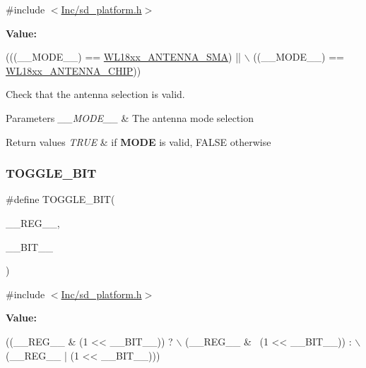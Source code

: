 {\ttfamily \#include $<$\mbox{\hyperlink{sd__platform_8h}{Inc/sd\+\_\+platform.\+h}}$>$}

{\bfseries Value\+:}
\begin{DoxyCode}
(((\_\_MODE\_\_) == \mbox{\hyperlink{group___s_d___antenna___select_gad34710c5325cf565b89f2ce2f6fde3ae}{WL18xx\_ANTENNA\_SMA}}) || \(\backslash\)
                       ((\_\_MODE\_\_) == \mbox{\hyperlink{group___s_d___antenna___select_ga1de725e07aecec98314b752abb71e644}{WL18xx\_ANTENNA\_CHIP}}))
\end{DoxyCode}


Check that the antenna selection is valid. 


\begin{DoxyParams}{Parameters}
{\em \+\_\+\+\_\+\+M\+O\+D\+E\+\_\+\+\_\+} & The antenna mode selection \\
\hline
\end{DoxyParams}

\begin{DoxyRetVals}{Return values}
{\em T\+R\+UE} & if {\bfseries M\+O\+DE} is valid, F\+A\+L\+SE otherwise \\
\hline
\end{DoxyRetVals}
\mbox{\label{group___s_d___platform___defines_ga7b2c7e2a005cad6b7572974e6a8fd4f8}} 
\subsubsection{\texorpdfstring{T\+O\+G\+G\+L\+E\+\_\+\+B\+IT}{TOGGLE\_BIT}}
{\footnotesize\ttfamily \#define T\+O\+G\+G\+L\+E\+\_\+\+B\+IT(\begin{DoxyParamCaption}\item[{}]{\+\_\+\+\_\+\+R\+E\+G\+\_\+\+\_\+,  }\item[{}]{\+\_\+\+\_\+\+B\+I\+T\+\_\+\+\_\+ }\end{DoxyParamCaption})}



{\ttfamily \#include $<$\mbox{\hyperlink{sd__platform_8h}{Inc/sd\+\_\+platform.\+h}}$>$}

{\bfseries Value\+:}
\begin{DoxyCode}
((\_\_REG\_\_ & (1 << \_\_BIT\_\_)) ? \(\backslash\)
                     (\_\_REG\_\_ & ~(1 << \_\_BIT\_\_)) : \(\backslash\)
                     (\_\_REG\_\_ | (1 << \_\_BIT\_\_)))
\end{DoxyCode}


